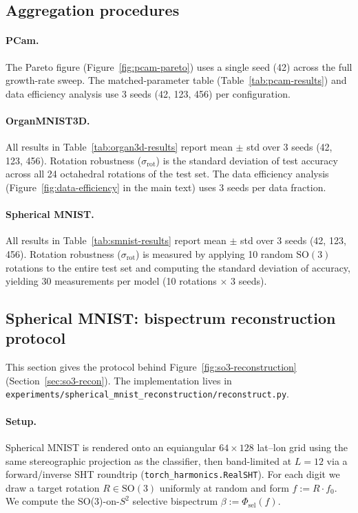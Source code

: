 \documentclass{article}
\theoremstyle{definition}
\theoremstyle{remark}
\newcommand{\SO}{\mathrm{SO}}
\theoremstyle{definition}
\begin{document}
\subsection{Aggregation procedures}

\paragraph{PCam.}
The Pareto figure (Figure~\ref{fig:pcam-pareto}) uses a single seed
(42) across the full growth-rate sweep. The matched-parameter table
(Table~\ref{tab:pcam-results}) and data efficiency analysis use 3 seeds
(42, 123, 456) per configuration.

\paragraph{OrganMNIST3D.}
All results in Table~\ref{tab:organ3d-results} report mean $\pm$ std
over 3 seeds (42, 123, 456). Rotation robustness
($\sigma_{\mathrm{rot}}$) is the standard deviation of test accuracy
across all 24 octahedral rotations of the test set. The data
efficiency analysis (Figure~\ref{fig:data-efficiency} in the main text) uses 3 seeds per data
fraction.

\paragraph{Spherical MNIST.}
All results in Table~\ref{tab:smnist-results} report mean $\pm$ std
over 3 seeds (42, 123, 456). Rotation robustness
($\sigma_{\mathrm{rot}}$) is measured by applying 10 random $\SO(3)$
rotations to the entire test set and computing the standard deviation
of accuracy, yielding 30 measurements per model (10 rotations
$\times$ 3 seeds).

\subsection{Spherical MNIST: bispectrum reconstruction protocol}
\label{app:so3-recon}

This section gives the protocol behind
Figure~\ref{fig:so3-reconstruction} (Section~\ref{sec:so3-recon}).
The implementation lives in
\texttt{experiments/spherical\_mnist\_reconstruction/reconstruct.py}.

\paragraph{Setup.}
Spherical MNIST is rendered onto an equiangular $64{\times}128$
lat--lon grid using the same stereographic projection as the
classifier, then band-limited at $L = 12$ via a forward/inverse SHT
roundtrip (\texttt{torch\_harmonics.RealSHT}). For each digit we
draw a target rotation $R\in\SO(3)$ uniformly at random and form
$f := R\cdot f_0$. We compute the SO(3)-on-$S^2$ selective bispectrum
$\beta := \Phi_{\mathrm{sel}}(f)$.
\end{document}
